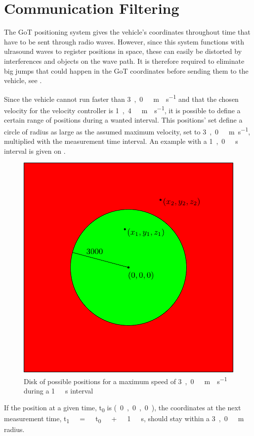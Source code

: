 \section{Communication Filtering}
The GoT positioning system gives the vehicle's coordinates throughout time that have to be sent through radio waves. However, since this system functions with ulrasound waves to register positions in space, these can easily be distorted by interferences and objects on the wave path. It is therefore required to eliminate big jumps that could happen in the GoT coordinates before sending them to the vehicle, see .

Since the vehicle cannot run faster than \si{3,0\ m \cdot s^{-1}} and that the chosen velocity for the velocity controller is \si{1,4\ m \cdot s^{-1}}, it is possible to define a certain range of positions during a wanted interval. This positions' set define a circle of radius as large as the assumed maximum velocity, set to \si{3,0\ m.s^{-1}}, multiplied with the measurement time interval. An example with a \si{1,0\ s} interval is given on .
\begin{figure}[H]
  \centering
  \includegraphics[scale=0.6]{figures/GoTFilterSimple.pdf}
  \caption{Disk of possible positions for a maximum speed of \si{3,0\ m \cdot s^{-1}} during a \si{1\ s} interval}
  \label{GoTFilterSimple}
\end{figure}
If the position at a given time, \si{t_0} is \si{(0,0,0)}, the coordinates at the next measurement time, \si{t_1\ =\ t_0\ +\ 1\ s}, should stay within a \si{3,0\ m} radius.

